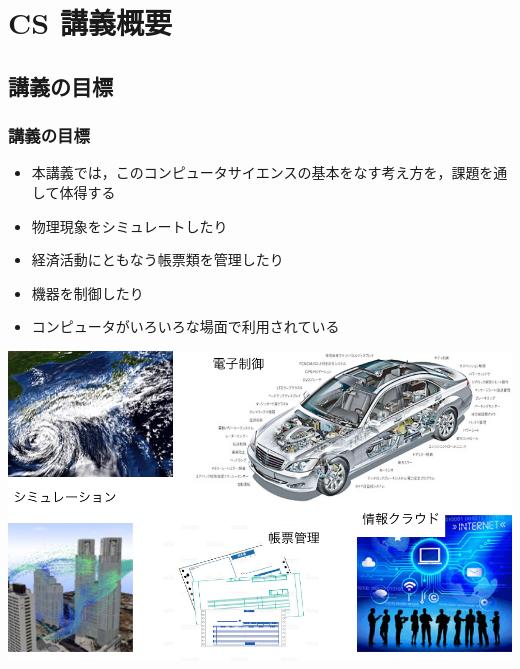 \section{CS 講義概要}
%
%
\subsection{講義の目標}
\begin{frame}
\frametitle{講義の目標}
  \begin{itemize}
\item 本講義では，このコンピュータサイエンスの基本をなす考え方を，課題を通して体得する
\item 物理現象をシミュレートしたり
\item 経済活動にともなう帳票類を管理したり
\item 機器を制御したり
\item コンピュータがいろいろな場面で利用されている
  \end{itemize}
\centering
\includegraphics[scale=.35]{./Figure/elementaryCS-1st-FigComputer.pdf}
\end{frame}
